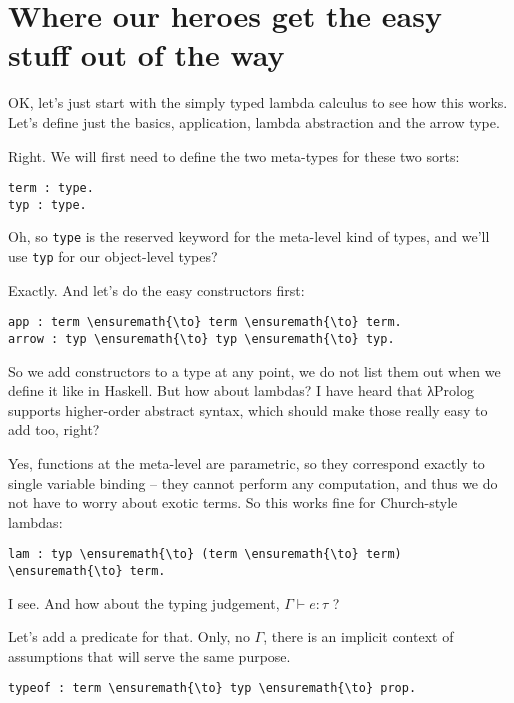 \section{Where our heroes get the easy stuff out of the
way}\label{where-our-heroes-get-the-easy-stuff-out-of-the-way}

\heroSTUDENT{} OK, let's just start with the simply typed lambda calculus to
see how this works. Let's define just the basics, application, lambda
abstraction and the arrow type.

\heroADVISOR{} Right. We will first need to define the two meta-types for
these two sorts:

\begin{verbatim}
term : type.
typ : type.
\end{verbatim}

\heroSTUDENT{} Oh, so \texttt{type} is the reserved keyword for the meta-level
kind of types, and we'll use \texttt{typ} for our object-level types?

\heroADVISOR{} Exactly. And let's do the easy constructors first:

\begin{verbatim}
app : term \ensuremath{\to} term \ensuremath{\to} term.
arrow : typ \ensuremath{\to} typ \ensuremath{\to} typ.
\end{verbatim}

\heroSTUDENT{} So we add constructors to a type at any point, we do not list
them out when we define it like in Haskell. But how about lambdas? I
have heard that \foreignlanguage{greek}{λ}Prolog supports higher-order abstract syntax, which
should make those really easy to add too, right?

\heroADVISOR{} Yes, functions at the meta-level are parametric, so they
correspond exactly to single variable binding -- they cannot perform any
computation, and thus we do not have to worry about exotic terms. So
this works fine for Church-style lambdas:

\begin{verbatim}
lam : typ \ensuremath{\to} (term \ensuremath{\to} term) \ensuremath{\to} term.
\end{verbatim}

\heroSTUDENT{} I see. And how about the typing judgement,
\(\Gamma \vdash e : \tau\) ?

\heroADVISOR{} Let's add a predicate for that. Only, no \(\Gamma\), there is
an implicit context of assumptions that will serve the same purpose.

\begin{verbatim}
typeof : term \ensuremath{\to} typ \ensuremath{\to} prop.
\end{verbatim}

